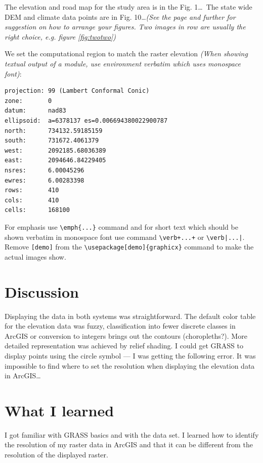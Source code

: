 \documentclass[10pt]{article}
\begin{document}
The elevation and road map for the study area is in the Fig. 1\ldots\ The state wide DEM
and climate data points are in Fig. 10\ldots \emph{(See the page \pageref{fig:figure-internal-label} and further
for suggestion on how to arrange your figures. Two images in row are usually the right choice,
e.g. figure \ref{fig:twotwo})}

We set the computational region to match the raster elevation
\emph{(When showing textual output of a module, use environment verbatim which uses monospace font)}:
\begin{verbatim}
projection: 99 (Lambert Conformal Conic)
zone:       0
datum:      nad83
ellipsoid:  a=6378137 es=0.006694380022900787
north:      734132.59185159
south:      731672.4061379
west:       2092185.68036389
east:       2094646.84229405
nsres:      6.00045296
ewres:      6.00283398
rows:       410
cols:       410
cells:      168100
\end{verbatim}
For emphasis use \verb|\emph{...}| command and for short text which should be shown
verbatim in monospace font use command \verb|\verb+...+| or \verb+\verb|...|+.
Remove \verb|[demo]| from the \verb|\usepackage[demo]{graphicx}| command
to make the actual images show.

\section*{Discussion}

Displaying the data in both systems was straightforward. The default color table
for the elevation data was fuzzy, classification into fewer discrete classes
in ArcGIS or conversion to integers brings out the contours (choropleths?).
More detailed representation was achieved by relief shading.
I could get GRASS to display points using the circle symbol --- I was getting the following error.
It was impossible to find where to set the resolution when displaying the elevation data in ArcGIS\ldots


\section*{What I learned}

I got familiar with GRASS basics and with the data set.
I learned how to identify the resolution of my raster data in ArcGIS
and that it can be different from the resolution of the displayed raster.
\end{document}
